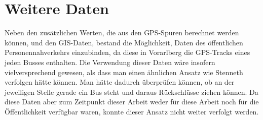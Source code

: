 \section{Weitere Daten}
Neben den zusätzlichen Werten, die aus den GPS-Spuren berechnet werden können, und den GIS-Daten, bestand die Möglichkeit, Daten des öffentlichen Personennahverkehrs einzubinden, da diese in Vorarlberg die GPS-Tracks eines jeden Busses enthalten. Die Verwendung dieser Daten wäre insofern vielversprechend gewesen, als dass man einen ähnlichen Ansatz wie Stenneth verfolgen hätte können. Man hätte dadurch überprüfen können, ob an der jeweiligen Stelle gerade ein Bus steht und daraus Rückschlüsse ziehen können. Da diese Daten aber zum Zeitpunkt dieser Arbeit weder für diese Arbeit noch für die Öffentlichkeit verfügbar waren, konnte dieser Ansatz nicht weiter verfolgt werden.

\clearpage
